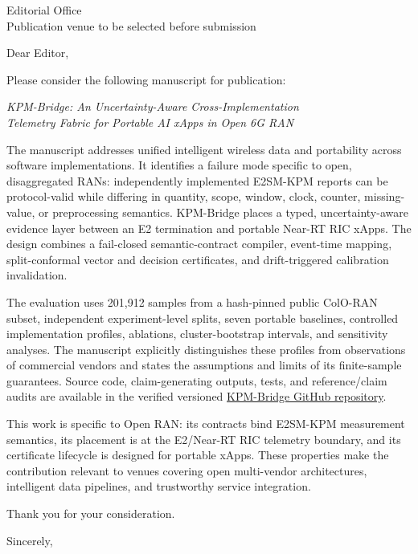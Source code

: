 \documentclass[11pt]{letter}
\date{13 July 2026}
\begin{document}
\begin{letter}{Editorial Office\\
Publication venue to be selected before submission}

\opening{Dear Editor,}

Please consider the following manuscript for publication:

\begin{center}
\emph{KPM-Bridge: An Uncertainty-Aware Cross-Implementation\\
Telemetry Fabric for Portable AI xApps in Open 6G RAN}
\end{center}

The manuscript addresses unified intelligent wireless data and portability
across software implementations. It identifies a failure
mode specific to open, disaggregated RANs: independently implemented
E2SM-KPM reports can be protocol-valid while differing in quantity, scope,
window, clock, counter, missing-value, or preprocessing semantics. KPM-Bridge
places a typed, uncertainty-aware evidence layer between an E2 termination and
portable Near-RT RIC xApps. The design combines a fail-closed semantic-contract
compiler, event-time mapping, split-conformal vector and decision certificates,
and drift-triggered calibration invalidation.

The evaluation uses 201,912 samples from a hash-pinned public ColO-RAN subset,
independent experiment-level splits, seven portable baselines, controlled
implementation profiles, ablations, cluster-bootstrap intervals, and
sensitivity analyses. The manuscript explicitly distinguishes these profiles
from observations of commercial vendors and states the assumptions and limits
of its finite-sample guarantees. Source code, claim-generating outputs, tests,
and reference/claim audits are available in the verified versioned
\href{https://github.com/YassirALKarawi/kpm-bridge-open6g-ran}{KPM-Bridge GitHub repository}.

This work is specific to Open RAN: its contracts bind E2SM-KPM measurement
semantics, its placement is at the E2/Near-RT RIC telemetry boundary, and its
certificate lifecycle is designed for portable xApps. These properties make
the contribution relevant to venues covering open multi-vendor architectures,
intelligent data pipelines, and trustworthy service integration.

Thank you for your consideration.

\closing{Sincerely,}

\end{letter}
\end{document}
